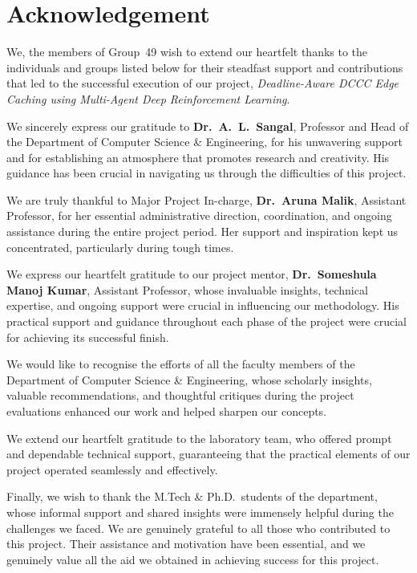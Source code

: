 \documentclass[12pt,a4paper]{report}
\begin{document}
\chapter*{Acknowledgement}

We, the members of Group~49 wish to extend our heartfelt thanks to the individuals and groups
listed below for their steadfast support and contributions that led to the successful execution of
our project, \textit{Deadline-Aware DCCC Edge Caching using Multi-Agent Deep Reinforcement
Learning}.

We sincerely express our gratitude to \textbf{Dr.\ A.\ L.\ Sangal}, Professor and Head of the
Department of Computer Science \& Engineering, for his unwavering support and for establishing
an atmosphere that promotes research and creativity. His guidance has been crucial in navigating
us through the difficulties of this project.

We are truly thankful to Major Project In-charge, \textbf{Dr.\ Aruna Malik}, Assistant Professor,
for her essential administrative direction, coordination, and ongoing assistance during the entire
project period. Her support and inspiration kept us concentrated, particularly during tough times.

We express our heartfelt gratitude to our project mentor, \textbf{Dr.\ Someshula Manoj Kumar},
Assistant Professor, whose invaluable insights, technical expertise, and ongoing support were
crucial in influencing our methodology. His practical support and guidance throughout each phase
of the project were crucial for achieving its successful finish.

We would like to recognise the efforts of all the faculty members of the Department of Computer
Science \& Engineering, whose scholarly insights, valuable recommendations, and thoughtful
critiques during the project evaluations enhanced our work and helped sharpen our concepts.

We extend our heartfelt gratitude to the laboratory team, who offered prompt and dependable
technical support, guaranteeing that the practical elements of our project operated seamlessly
and effectively.

Finally, we wish to thank the M.Tech \& Ph.D.\ students of the department, whose informal
support and shared insights were immensely helpful during the challenges we faced. We are
genuinely grateful to all those who contributed to this project. Their assistance and motivation
have been essential, and we genuinely value all the aid we obtained in achieving success for
this project.
\end{document}

